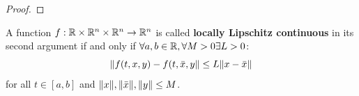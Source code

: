 \documentclass[10pt]{article}
\begin{document}
\begin{lemma}
    \label{lemma-continuity}

\end{lemma}

\begin{proof}
\end{proof}

\begin{definition}
    \label{definition-lipschitz}

    A function $f:\mathbb{R}\times\mathbb{R}^n\times\mathbb{R}^n\rightarrow\mathbb{R}^n$ is called \textbf{locally Lipschitz continuous} in its second argument if and only if $\forall a,b\in\mathbb{R},\forall M>0 \exists L>0$:
    \begin{equation}
        \lVert f(t,x,y) - f(t,\bar{x},y\rVert \leq L\lVert x - \bar{x}\rVert
    \end{equation}
    for all $t\in [a,b]$ and $\lVert x\rVert,\lVert\bar{x}\rVert,\lVert y\rVert\leq M$.
\end{definition}
\end{document}
